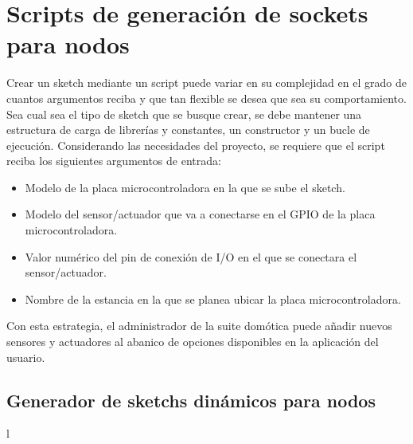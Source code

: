 \section{Scripts de generación de sockets para nodos}
\label{ch:Capitulo4.3.1}

Crear un \gls{sketch} mediante un script puede variar en su complejidad en el grado de cuantos argumentos reciba y que tan flexible se desea que sea su comportamiento. Sea cual sea el tipo de \gls{sketch} que se busque crear, se debe mantener una estructura de carga de librerías y constantes, un constructor y un bucle de ejecución. Considerando las necesidades del proyecto, se requiere que el script reciba los siguientes argumentos de entrada:

\begin{itemize}
  \item Modelo de la placa microcontroladora en la que se sube el \gls{sketch}.

  \item Modelo del sensor/actuador que va a conectarse en el GPIO de la placa microcontroladora.

  \item Valor numérico del pin de conexión de I/O en el que se conectara el sensor/actuador.
  
  \item Nombre de la estancia en la que se planea ubicar la placa microcontroladora.
\end{itemize}

Con esta estrategia, el administrador de la suite domótica puede añadir nuevos sensores y actuadores al abanico de opciones disponibles en la aplicación del usuario.

\subsection{Generador de sketchs dinámicos para nodos}
l\label{ch:Capitulo4.3.2}

